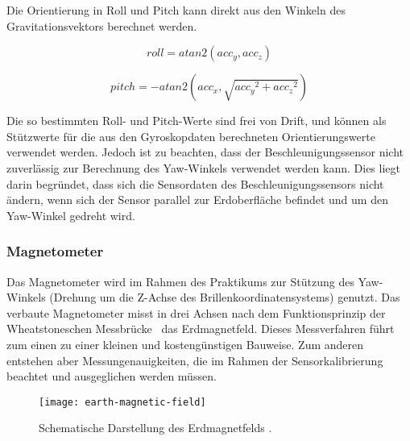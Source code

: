 
Die Orientierung in Roll und Pitch kann direkt aus den Winkeln des Gravitationsvektors berechnet werden.

\begin{equation}
    roll = atan2(acc_y, acc_z)
\end{equation}

\begin{equation}
    pitch = -atan2(acc_x, \sqrt{ {acc_y}^2 + {acc_z}^2 })
\end{equation}

Die so bestimmten Roll- und Pitch-Werte sind frei von Drift, und können als Stützwerte für die aus den Gyroskopdaten berechneten Orientierungswerte verwendet werden.
Jedoch ist zu beachten, dass der Beschleunigungssensor nicht zuverlässig zur Berechnung des Yaw-Winkels verwendet werden kann.
Dies liegt darin begründet, dass sich die Sensordaten des Beschleunigungssensors nicht ändern, wenn sich der Sensor parallel zur Erdoberfläche befindet und um den Yaw-Winkel gedreht wird.





\subsubsection{Magnetometer}
\label{headtracking_magnetometer_subsubsec}

Das Magnetometer wird im Rahmen des Praktikums zur Stützung des Yaw-Winkels (Drehung um die Z-Achse des Brillenkoordinatensystems) genutzt.
Das verbaute Magnetometer misst in drei Achsen nach dem Funktionsprinzip der Wheatstoneschen Messbrücke~\cite{renaudin2010complete} das Erdmagnetfeld.
Dieses Messverfahren führt zum einen zu einer kleinen und kostengünstigen Bauweise.
Zum anderen entstehen aber Messungenauigkeiten, die im Rahmen der Sensorkalibrierung beachtet und ausgeglichen werden müssen.

\begin{figure}[h]
   \centering
   \texttt{[image: earth-magnetic-field]}
   \caption[mag_world]{Schematische Darstellung des Erdmagnetfelds \cite{mag_world_source}.}
   \label{fig:mag_world}
\end{figure}


